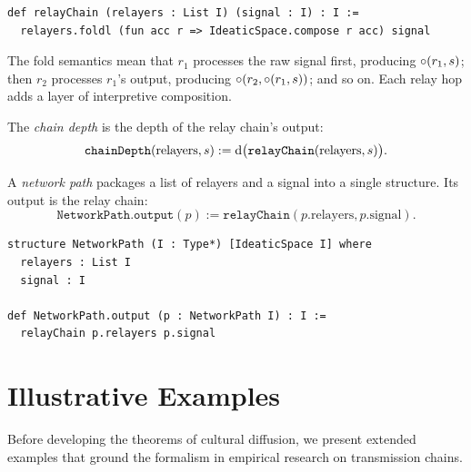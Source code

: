\begin{lstlisting}[caption={Relay chain in Lean}]
def relayChain (relayers : List I) (signal : I) : I :=
  relayers.foldl (fun acc r => IdeaticSpace.compose r acc) signal
\end{lstlisting}

The fold semantics mean that $r_1$ processes the raw signal first, producing
$\circ(r_1, s)$; then $r_2$ processes $r_1$'s output, producing
$\circ(r_2, \circ(r_1, s))$; and so on.  Each relay hop adds a layer
of interpretive composition.

\begin{definition}
\label{def:chainDepth}
The \emph{chain depth} is the depth of the relay chain's output:
\[
  \texttt{chainDepth}(\text{relayers}, s) := \operatorname{d}\bigl(\texttt{relayChain}(\text{relayers}, s)\bigr).
\]
\end{definition}

\begin{definition}
\label{def:NetworkPath}
A \emph{network path} packages a list of relayers and a signal into a
single structure.  Its output is the relay chain:
\[
  \texttt{NetworkPath.output}(p) := \texttt{relayChain}(p.\text{relayers}, p.\text{signal}).
\]
\end{definition}

\begin{lstlisting}[caption={Network path structure in Lean}]
structure NetworkPath (I : Type*) [IdeaticSpace I] where
  relayers : List I
  signal : I

def NetworkPath.output (p : NetworkPath I) : I :=
  relayChain p.relayers p.signal
\end{lstlisting}

\section{Illustrative Examples}
\label{sec:ch18-examples}

Before developing the theorems of cultural diffusion, we present extended
examples that ground the formalism in empirical research on transmission
chains.

